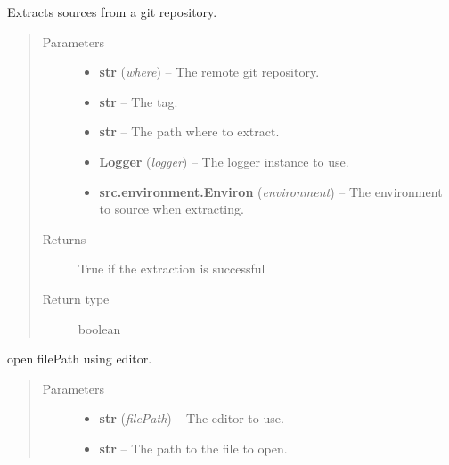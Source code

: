 \documentclass[a4paper,10pt,english]{sphinxmanual}
\begin{document}

\begin{fulllineitems}
\label{commands/apidoc/src:src.system.git_extract}
Extracts sources from a git repository.
\begin{quote}\begin{description}
\item[{Parameters}] \leavevmode\begin{itemize}
\item {} 
\textbf{str} (\emph{where}) -- The remote git repository.

\item {} 
\textbf{str} -- The tag.

\item {} 
\textbf{str} -- The path where to extract.

\item {} 
\textbf{Logger} (\emph{logger}) -- The logger instance to use.

\item {} 
\textbf{src.environment.Environ} (\emph{environment}) -- The environment to source when
extracting.

\end{itemize}

\item[{Returns}] \leavevmode
True if the extraction is successful

\item[{Return type}] \leavevmode
boolean

\end{description}\end{quote}

\end{fulllineitems}


\begin{fulllineitems}
\label{commands/apidoc/src:src.system.show_in_editor}
open filePath using editor.
\begin{quote}\begin{description}
\item[{Parameters}] \leavevmode\begin{itemize}
\item {} 
\textbf{str} (\emph{filePath}) -- The editor to use.

\item {} 
\textbf{str} -- The path to the file to open.

\end{itemize}

\end{description}\end{quote}

\end{fulllineitems}
\end{document}
